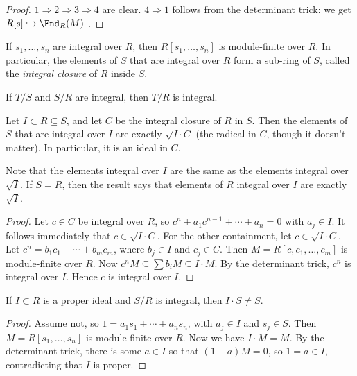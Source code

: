  \begin{proof}
   $1\Rightarrow 2\Rightarrow 3\Rightarrow 4$ are clear. $4\Rightarrow 1$ follows from
   the determinant trick: we get $R[s]\hookrightarrow \End_R(M)$ .
 \end{proof}
 \begin{corollary}
   If $s_1,\dots, s_n$ are integral over $R$, then $R[s_1,\dots, s_n]$ is module-finite
   over $R$. In particular, the elements of $S$ that are integral over $R$ form a
   sub-ring of $S$, called the \emph{integral closure} of $R$ inside $S$.
 \end{corollary}
 \begin{corollary}
   If $T/S$ and $S/R$ are integral, then $T/R$ is integral.
 \end{corollary}
 \begin{proposition}
   Let $I\subset R\subseteq S$, and let $C$ be the integral closure of $R$ in $S$. Then the
   elements of $S$ that are integral over $I$ are exactly $\sqrt{I\cdot C}$ (the radical
   in $C$, though it doesn't matter). In particular, it is an ideal in $C$.
 \end{proposition}
 \begin{remark}
   Note that the elements integral over $I$ are the same as the elements integral over
   $\sqrt I$. If $S=R$, then the result says that elements of $R$ integral over $I$ are
   exactly $\sqrt I$.
 \end{remark}
 \begin{proof}
   Let $c\in C$ be integral over $R$, so $c^n+a_1c^{n-1}+\cdots +a_n=0$ with $a_j\in I$.
   It follows immediately that $c\in \sqrt {I\cdot C}$. For the other containment, let
   $c\in \sqrt {I\cdot C}$. Let $c^n=b_1c_1+\cdots + b_mc_m$, where $b_j\in I$ and
   $c_j\in C$. Then $M=R[c,c_1,\dots, c_m]$ is module-finite over $R$. Now $c^nM\subseteq
   \sum b_iM\subseteq I\cdot M$. By the determinant trick, $c^n$ is integral over $I$.
   Hence $c$ is integral over $I$.
 \end{proof}
 \begin{lemma}
   If $I\subset R$ is a proper ideal and $S/R$ is integral, then $I\cdot S\neq S$.
 \end{lemma}
 \begin{proof}
   Assume not, so $1=a_1s_1+\cdots+a_ns_n$, with $a_j\in I$ and $s_j\in S$. Then
   $M=R[s_1,\dots, s_n]$ is module-finite over $R$. Now we have $I\cdot M=M$. By the
   determinant trick, there is some $a\in I$ so that $(1-a)M=0$, so $1=a\in I$,
   contradicting that $I$ is proper.
 \end{proof}
 \setcounter{lecture}{24}
